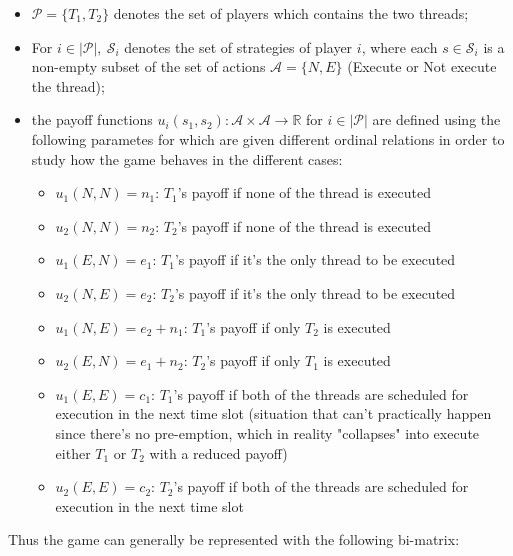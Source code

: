 \begin{itemize}

  \item $\mathcal{P} = \{T_1, T_2\}$ denotes the set of players which contains
    the two threads;

  \item For $i \in |\mathcal{P}|,\ \mathcal{S}_i$ denotes the set of strategies
    of player $i$, where each $s \in \mathcal{S}_i$ is a non-empty subset of
    the set of actions $\mathcal{A} = \{ N, E \}$ (Execute or Not execute the
    thread);

  \item the payoff functions
    $u_i(s_1, s_2): \mathcal{A} \times \mathcal{A} \to \mathbb{R}$
    for $i \in |\mathcal{P}|$ are defined using the following parametes for which are
    given different ordinal relations in order to study how the game behaves
    in the different cases: 

    \begin{itemize}
      \item $u_1(N, N) = n_1$: $T_1$'s payoff if none of the thread is executed
      \item $u_2(N, N) = n_2$: $T_2$'s payoff if none of the thread is executed

      \item $u_1(E, N) = e_1$: $T_1$'s payoff if it's the only thread to be executed
      \item $u_2(N, E) = e_2$: $T_2$'s payoff if it's the only thread to be executed

      \item $u_1(N, E) = e_2 + n_1$: $T_1$'s payoff if only $T_2$ is executed
      \item $u_2(E, N) = e_1 + n_2$: $T_2$'s payoff if only $T_1$ is executed

      \item $u_1(E, E) = c_1$: $T_1$'s payoff if both of the threads are
        scheduled for execution in the next time slot (situation that can't
        practically happen since there's no pre-emption, which in reality
        "collapses" into execute either $T_1$ or $T_2$ with a reduced payoff)
      \item $u_2(E, E) = c_2$: $T_2$'s payoff if both of the threads are
        scheduled for execution in the next time slot
    \end{itemize}
\end{itemize}

Thus the game can generally be represented with the following bi-matrix:

